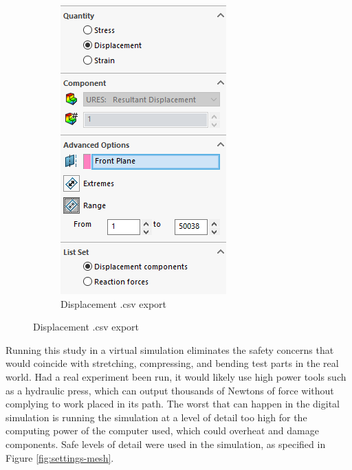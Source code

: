\documentclass[12pt, letterpaper]{article}
\begin{document}
\begin{figure}[H]
\begin{subfigure}[t]{.3\linewidth}
	\end{subfigure}
	\begin{subfigure}[t]{.3\linewidth}
		\caption{Displacement .csv export}
		\includegraphics[width=\linewidth]{./procedure/displacement-list}
	\end{subfigure}
\end{figure}

Running this study in a virtual simulation eliminates the safety concerns that would coincide with stretching, compressing, and bending test parts in the real world. Had a real experiment been run, it would likely use high power tools such as a hydraulic press, which can output thousands of Newtons of force without complying to work placed in its path. The worst that can happen in the digital simulation is running the simulation at a level of detail too high for the computing power of the computer used, which could overheat and damage components. Safe levels of detail were used in the simulation, as specified in Figure \ref{fig:settings-mesh}.
\end{document}

